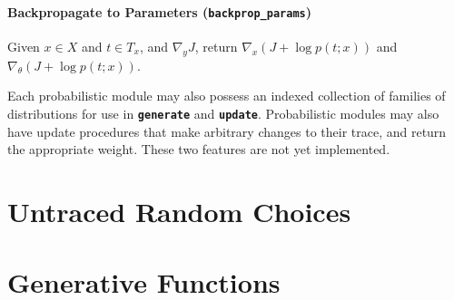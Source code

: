 \documentclass{article}
\newcommand{\code}[1]{\texttt{\small{\textbf{#1}}}}
\begin{document}
\paragraph{Backpropagate to Parameters (\code{backprop\_params})}
Given $x \in X$ and $t \in T_x$, and $\nabla_y J$, return $\nabla_x (J + \log p(t; x))$ and $\nabla_{\theta} (J + \log p(t; x))$.


Each probabilistic module may also possess an indexed collection of families of distributions for use in \code{generate} and \code{update}.
Probabilistic modules may also have update procedures that make arbitrary changes to their trace, and return the appropriate weight.
These two features are not yet implemented.

\section{Untraced Random Choices}

\section{Generative Functions}

\clearpage


\end{document}
